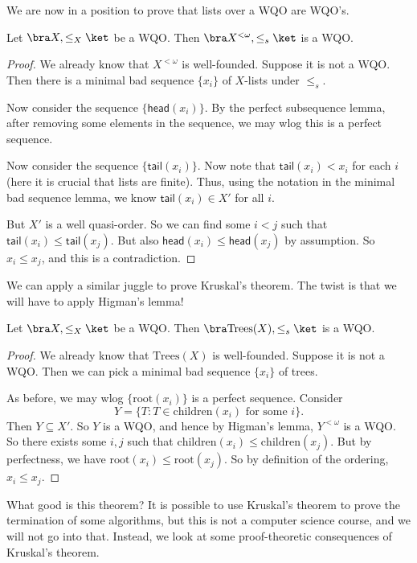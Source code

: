 \documentclass[a4paper]{article}
\newcommand\head{\mathsf{head}}
\newcommand\tail{\mathsf{tail}}
\begin{document}
We are now in a position to prove that lists over a WQO are WQO's.
\begin{lemma}
  Let $\bra X, \leq_X\ket$ be a WQO. Then $\bra X^{<\omega}, \leq_s\ket$ is a WQO.
\end{lemma}

\begin{proof}
  We already know that $X^{<\omega}$ is well-founded. Suppose it is not a WQO. Then there is a minimal bad sequence $\{x_i\}$ of $X$-lists under $\leq_s$.

  Now consider the sequence $\{\head(x_i)\}$. By the perfect subsequence lemma, after removing some elements in the sequence, we may wlog this is a perfect sequence.

  Now consider the sequence $\{\tail(x_i)\}$. Now note that $\tail(x_i) < x_i$ for each $i$ (here it is crucial that lists are finite). Thus, using the notation in the minimal bad sequence lemma, we know $\tail(x_i) \in X'$ for all $i$.

  But $X'$ is a well quasi-order. So we can find some $i < j$ such that $\tail(x_i) \leq \tail(x_j)$. But also $\head (x_i) \leq \head(x_j)$ by assumption. So $x_i \leq x_j$, and this is a contradiction.
\end{proof}

We can apply a similar juggle to prove Kruskal's theorem. The twist is that we will have to apply Higman's lemma!

\begin{thm}
  Let $\bra X, \leq_X\ket$ be a WQO. Then $\bra \mathrm{Trees}(X), \leq_s\ket$ is a WQO.
\end{thm}

\begin{proof}
  We already know that $\mathrm{Trees}(X)$ is well-founded. Suppose it is not a WQO. Then we can pick a minimal bad sequence $\{x_i\}$ of trees.

  As before, we may wlog $\{\mathrm{root}(x_i)\}$ is a perfect sequence. Consider
  \[
    Y = \{T: T \in \mathrm{children}(x_i)\text{ for some }i\}.
  \]
  Then $Y \subseteq X'$. So $Y$ is a WQO, and hence by Higman's lemma, $Y^{<\omega}$ is a WQO. So there exists some $i, j$ such that $\mathrm{children}(x_i) \leq \mathrm{children}(x_j)$. But by perfectness, we have $\mathrm{root}(x_i) \leq \mathrm{root}(x_j)$. So by definition of the ordering, $x_i \leq x_j$.
\end{proof}

What good is this theorem? It is possible to use Kruskal's theorem to prove the termination of some algorithms, but this is not a computer science course, and we will not go into that. Instead, we look at some proof-theoretic consequences of Kruskal's theorem.
\end{document}
